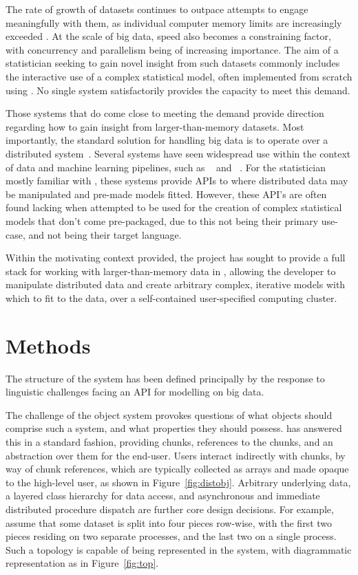 The rate of growth of datasets continues to outpace attempts to engage meaningfully with them, as individual computer memory limits are increasingly exceeded \cite{kleppmann2017dataintensive}.
At the scale of big data, speed also becomes a constraining factor, with concurrency and parallelism being of increasing importance.
The aim of a statistician seeking to gain novel insight from such datasets commonly includes the interactive use of a complex statistical model, often implemented from scratch using \R.
No single system satisfactorily provides the capacity to meet this demand.

Those systems that do come close to meeting the demand provide direction regarding how to gain insight from larger-than-memory datasets.
Most importantly, the standard solution for handling big data is to operate over a distributed system~\cite{boja2012distributed}.
Several systems have seen widespread use within the context of data and machine learning pipelines, such as ~\cite{zaharia2016apache} and ~\cite{shvachko2010hadoop}.
For the statistician mostly familiar with \R, these systems provide APIs to \R where distributed data may be manipulated and pre-made models fitted.
However, these API's are often found lacking when attempted to be used for the creation of complex statistical models that don't come pre-packaged, due to this not being their primary use-case, and \R not being their target language.

Within the motivating context provided, the \lsr project has sought to provide a full stack for working with larger-than-memory data in \R, allowing the developer to manipulate distributed data and create arbitrary complex, iterative models with which to fit to the data, over a self-contained user-specified computing cluster.

\section{Methods}

The structure of the \lsr system has been defined principally by the response to linguistic challenges facing an API for modelling on big data.

The challenge of the object system provokes questions of what objects should comprise such a system, and what properties they should possess.
\lsr has answered this in a standard fashion, providing chunks, references to the chunks, and an abstraction over them for the end-user. Users interact indirectly with chunks, by way of chunk references, which are typically collected as arrays and made opaque to the high-level user, as shown in Figure~\ref{fig:distobj}. Arbitrary underlying data, a layered class hierarchy for data access, and asynchronous and immediate distributed procedure dispatch are further core design decisions.
For example, assume that some dataset is split into four pieces row-wise, with the first two pieces residing on two separate processes, and the last two on a single process.
Such a topology is capable of being represented in the \lsr system, with diagrammatic representation as in Figure~\ref{fig:top}.

